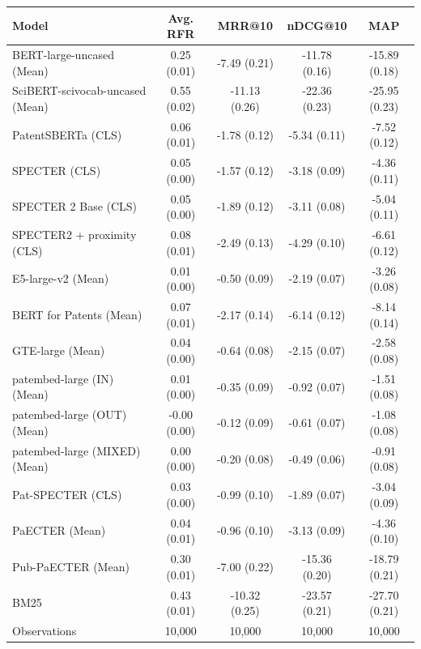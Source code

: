 \begin{tabular}{lcccc}
\toprule
Model & Avg. RFR & MRR@10 & nDCG@10 & MAP \\
\midrule
BERT-large-uncased (Mean) & 0.25\sym{***} (0.01) & -7.49\sym{***} (0.21) & -11.78\sym{***} (0.16) & -15.89\sym{***} (0.18) \\
SciBERT-scivocab-uncased (Mean) & 0.55\sym{***} (0.02) & -11.13\sym{***} (0.26) & -22.36\sym{***} (0.23) & -25.95\sym{***} (0.23) \\
PatentSBERTa (CLS) & 0.06\sym{***} (0.01) & -1.78\sym{***} (0.12) & -5.34\sym{***} (0.11) & -7.52\sym{***} (0.12) \\
SPECTER (CLS) & 0.05\sym{***} (0.00) & -1.57\sym{***} (0.12) & -3.18\sym{***} (0.09) & -4.36\sym{***} (0.11) \\
SPECTER 2 Base (CLS) & 0.05\sym{***} (0.00) & -1.89\sym{***} (0.12) & -3.11\sym{***} (0.08) & -5.04\sym{***} (0.11) \\
SPECTER2 + proximity (CLS) & 0.08\sym{***} (0.01) & -2.49\sym{***} (0.13) & -4.29\sym{***} (0.10) & -6.61\sym{***} (0.12) \\
E5-large-v2 (Mean) & 0.01\sym{**} (0.00) & -0.50\sym{***} (0.09) & -2.19\sym{***} (0.07) & -3.26\sym{***} (0.08) \\
BERT for Patents (Mean) & 0.07\sym{***} (0.01) & -2.17\sym{***} (0.14) & -6.14\sym{***} (0.12) & -8.14\sym{***} (0.14) \\
GTE-large (Mean) & 0.04\sym{***} (0.00) & -0.64\sym{***} (0.08) & -2.15\sym{***} (0.07) & -2.58\sym{***} (0.08) \\
patembed-large (IN) (Mean) & 0.01\sym{**} (0.00) & -0.35\sym{***} (0.09) & -0.92\sym{***} (0.07) & -1.51\sym{***} (0.08) \\
patembed-large (OUT) (Mean) & -0.00 (0.00) & -0.12 (0.09) & -0.61\sym{***} (0.07) & -1.08\sym{***} (0.08) \\
patembed-large (MIXED) (Mean) & 0.00 (0.00) & -0.20\sym{*} (0.08) & -0.49\sym{***} (0.06) & -0.91\sym{***} (0.08) \\
Pat-SPECTER (CLS) & 0.03\sym{***} (0.00) & -0.99\sym{***} (0.10) & -1.89\sym{***} (0.07) & -3.04\sym{***} (0.09) \\
PaECTER (Mean) & 0.04\sym{***} (0.01) & -0.96\sym{***} (0.10) & -3.13\sym{***} (0.09) & -4.36\sym{***} (0.10) \\
Pub-PaECTER (Mean) & 0.30\sym{***} (0.01) & -7.00\sym{***} (0.22) & -15.36\sym{***} (0.20) & -18.79\sym{***} (0.21) \\
BM25 & 0.43\sym{***} (0.01) & -10.32\sym{***} (0.25) & -23.57\sym{***} (0.21) & -27.70\sym{***} (0.21) \\
\midrule
Observations & 10,000 & 10,000 & 10,000 & 10,000 \\
\bottomrule
\end{tabular}
